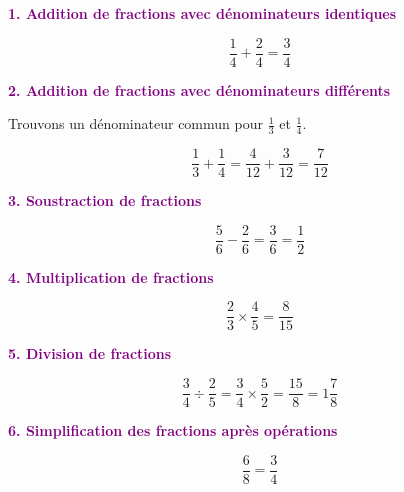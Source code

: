 \documentclass{article}
\begin{document}
\begin{tcolorbox}[colback=orange!10!white, colframe=orange!75!black, title=\textcolor{white}{Exemples d'opérations}, sharp corners=southwest]
    \textcolor{purple}{\textbf{1. Addition de fractions avec dénominateurs identiques}}
    
    \[
    \frac{1}{4} + \frac{2}{4} = \frac{3}{4}
    \]
    
    \vspace{10pt}
    \textcolor{purple}{\textbf{2. Addition de fractions avec dénominateurs différents}}
    
    Trouvons un dénominateur commun pour \(\frac{1}{3}\) et \(\frac{1}{4}\).
    
    \[
    \frac{1}{3} + \frac{1}{4} = \frac{4}{12} + \frac{3}{12} = \frac{7}{12}
    \]
    
    \vspace{10pt}
    \textcolor{purple}{\textbf{3. Soustraction de fractions}}
    
    \[
    \frac{5}{6} - \frac{2}{6} = \frac{3}{6} = \frac{1}{2}
    \]
    
    \vspace{10pt}
    \textcolor{purple}{\textbf{4. Multiplication de fractions}}
    
    \[
    \frac{2}{3} \times \frac{4}{5} = \frac{8}{15}
    \]
    
    \vspace{10pt}
    \textcolor{purple}{\textbf{5. Division de fractions}}
    
    \[
    \frac{3}{4} \div \frac{2}{5} = \frac{3}{4} \times \frac{5}{2} = \frac{15}{8} = 1 \frac{7}{8}
    \]
    
    \vspace{10pt}
    \textcolor{purple}{\textbf{6. Simplification des fractions après opérations}}
    
    \[
    \frac{6}{8} = \frac{3}{4}
    \]
\end{tcolorbox}

\vspace{0.2cm}
\end{document}
